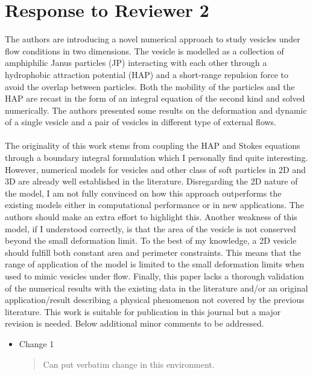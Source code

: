\documentclass[11pt]{article}
\newcommand{\comment}[1]{{\color{blue} #1}}
\begin{document}
\section*{Response to Reviewer 2}
\comment{
\noindent
The authors are introducing a novel numerical approach to study vesicles
under flow conditions in two dimensions. The vesicle is modelled as a
collection of amphiphilic Janus particles (JP) interacting with each
other through a hydrophobic attraction potential (HAP) and a short-range
repulsion force to avoid the overlap between particles. Both the
mobility of the particles and the HAP are recast in the form of an
integral equation of the second kind and solved numerically. The authors
presented some results on the deformation and dynamic of a single
vesicle and a pair of vesicles in different type of external flows.
\\ \\
\noindent
The originality of this work stems from coupling the HAP and Stokes
equations through a boundary integral formulation which I personally
find quite interesting. However, numerical models for vesicles and other
class of soft particles in 2D and 3D are already well established in the
literature. Disregarding the 2D nature of the model, I am not fully
convinced on how this approach outperforms the existing models either in
computational performance or in new applications. The authors should
make an extra effort to highlight this. Another weakness of this model,
if I understood correctly, is that the area of the vesicle is not
conserved beyond the small deformation limit. To the best of my
knowledge, a 2D vesicle should fulfill both constant area and perimeter
constraints. This means that the range of application of the model is
limited to the small deformation limits when used to mimic vesicles
under flow. Finally, this paper lacks a thorough validation of the
numerical results with the existing data in the literature and/or an
original application/result describing a physical phenomenon not covered
by the previous literature. This work is suitable for publication in
this journal but a major revision is needed. Below additional minor
comments to be addressed.}
\begin{itemize}
  \item Change 1
  \begin{quotation}
    \noindent
    Can put verbatim change in this environment.
  \end{quotation}
\end{itemize}
\end{document}
